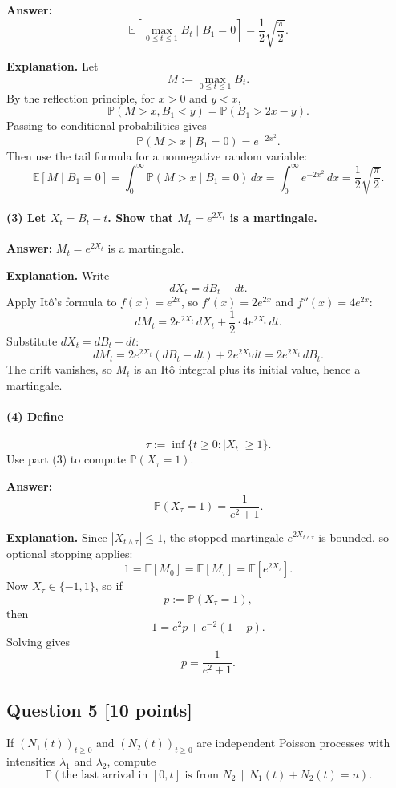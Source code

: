 \documentclass[11pt]{article}
\theoremstyle{definition}
\begin{document}
\textbf{Answer:}
\[
\mathbb E\!\left[\max_{0\le t\le 1} B_t \mid B_1=0\right]
=
\frac12\sqrt{\frac{\pi}{2}}.
\]

\textbf{Explanation.} Let
\[
M:=\max_{0\le t\le 1} B_t.
\]
By the reflection principle, for $x>0$ and $y<x$,
\[
\mathbb P(M>x, B_1<y)=\mathbb P(B_1>2x-y).
\]
Passing to conditional probabilities gives
\[
\mathbb P(M>x\mid B_1=0)=e^{-2x^2}.
\]
Then use the tail formula for a nonnegative random variable:
\[
\mathbb E[M\mid B_1=0]
=
\int_0^{\infty} \mathbb P(M>x\mid B_1=0)\,dx
=
\int_0^{\infty} e^{-2x^2}\,dx
=
\frac12\sqrt{\frac{\pi}{2}}.
\]

\paragraph{(3) Let $X_t=B_t-t$. Show that $M_t=e^{2X_t}$ is a martingale.}

\textbf{Answer:} $M_t=e^{2X_t}$ is a martingale.

\textbf{Explanation.} Write
\[
 dX_t=dB_t-dt.
\]
Apply It\^o's formula to $f(x)=e^{2x}$, so $f'(x)=2e^{2x}$ and $f''(x)=4e^{2x}$:
\[
 dM_t = 2e^{2X_t}\,dX_t + \frac12\cdot 4e^{2X_t}\,dt.
\]
Substitute $dX_t=dB_t-dt$:
\[
 dM_t = 2e^{2X_t}(dB_t-dt)+2e^{2X_t}dt = 2e^{2X_t}\,dB_t.
\]
The drift vanishes, so $M_t$ is an It\^o integral plus its initial value, hence a martingale.

\paragraph{(4) Define}
\[
\tau:=\inf\{t\ge 0: |X_t|\ge 1\}.
\]
Use part (3) to compute $\mathbb P(X_{\tau}=1)$.

\textbf{Answer:}
\[
\mathbb P(X_{\tau}=1)=\frac{1}{e^2+1}.
\]

\textbf{Explanation.} Since $|X_{t\wedge \tau}|\le 1$, the stopped martingale $e^{2X_{t\wedge\tau}}$ is bounded, so optional stopping applies:
\[
1 = \mathbb E[M_0] = \mathbb E[M_{\tau}] = \mathbb E[e^{2X_{\tau}}].
\]
Now $X_{\tau}\in\{-1,1\}$, so if
\[
 p:=\mathbb P(X_{\tau}=1),
\]
then
\[
1 = e^2 p + e^{-2}(1-p).
\]
Solving gives
\[
 p=\frac{1}{e^2+1}.
\]

\subsection*{Question 5 \hfill [10 points]}
If $(N_1(t))_{t\ge 0}$ and $(N_2(t))_{t\ge 0}$ are independent Poisson processes with intensities $\lambda_1$ and $\lambda_2$, compute
\[
\mathbb P\!
\left(
\text{the last arrival in }[0,t]\text{ is from }N_2
\,
\middle|
\,
N_1(t)+N_2(t)=n
\right).
\]
\end{document}

